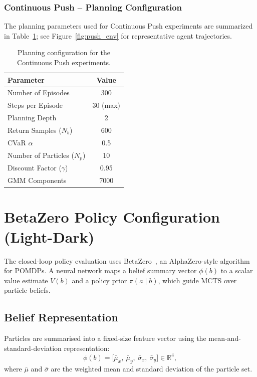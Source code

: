 \documentclass[acmlarge, manuscript, screen, review, natbib=false, oneside]{acmart}
\begin{document}
\subsubsection{Continuous Push -- Planning Configuration}

The planning parameters used for Continuous Push experiments are summarized in Table~\ref{tab:push_config}; see Figure~\ref{fig:push_env} for representative agent trajectories.

\begin{table}[ht]
	\centering
	\small
	\setlength{\tabcolsep}{4pt}
	\begin{tabular}{|l|c|}
		\hline
		\textbf{Parameter} & \textbf{Value} \\
		\hline
		Number of Episodes & 300 \\
		\hline
		Steps per Episode & 30 (max) \\
		\hline
		Planning Depth & 2 \\
		\hline
		Return Samples ($N_b$) & 600 \\
		\hline
		CVaR $\alpha$ & 0.5 \\
		\hline
		Number of Particles ($N_p$) & 10 \\
		\hline
		Discount Factor ($\gamma$) & 0.95 \\
		\hline
		GMM Components & 7000 \\
		\hline
	\end{tabular}
	\caption{Planning configuration for the Continuous Push experiments.}
	\label{tab:push_config}
\end{table}

\section{BetaZero Policy Configuration (Light-Dark)}\label{sec:betazero_config}

The closed-loop policy evaluation uses BetaZero~\cite{moss2024betazero}, an AlphaZero-style algorithm for POMDPs. A neural network maps a belief summary vector $\phi(b)$ to a scalar value estimate $V(b)$ and a policy prior $\pi(a \mid b)$, which guide MCTS over particle beliefs.

\subsection{Belief Representation}

Particles are summarised into a fixed-size feature vector using the mean-and-standard-deviation representation:
\begin{equation}
    \phi(b) = \bigl[\bar{\mu}_x,\ \bar{\mu}_y,\ \bar{\sigma}_x,\ \bar{\sigma}_y\bigr] \in \mathbb{R}^4,
\end{equation}
where $\bar{\mu}$ and $\bar{\sigma}$ are the weighted mean and standard deviation of the particle set.
\end{document}

